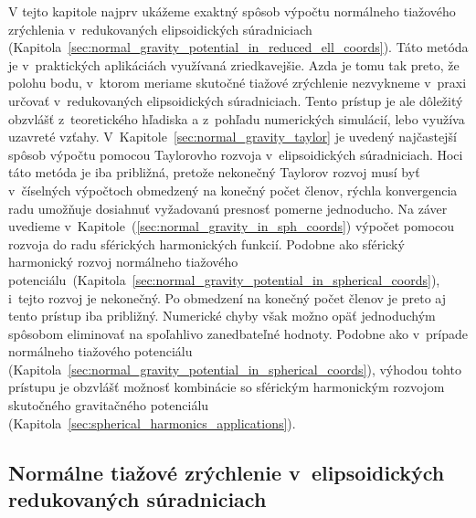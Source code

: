 \documentclass[a4paper,12pt]{book}
\begin{document}
V tejto kapitole najprv ukážeme exaktný spôsob výpočtu normálneho tiažového 
zrýchlenia v~redukovaných elipsoidických súradniciach 
(Kapitola~\ref{sec:normal_gravity_potential_in_reduced_ell_coords}).  Táto 
metóda je v~praktických aplikáciách využívaná zriedkavejšie.  Azda je tomu tak 
preto, že polohu bodu, v~ktorom meriame skutočné tiažové zrýchlenie nezvykneme 
v~praxi určovať v~redukovaných elipsoidických súradniciach.  Tento prístup je 
ale dôležitý obzvlášť z~teoretického hľadiska a z~pohľadu numerických 
simulácií, lebo využíva uzavreté vzťahy.  
V~Kapitole~\ref{sec:normal_gravity_taylor} je uvedený najčastejší spôsob 
výpočtu pomocou Taylorovho rozvoja v~elipsoidických súradniciach.  Hoci táto 
metóda je iba približná, pretože nekonečný Taylorov rozvoj musí byť v~číselných 
výpočtoch obmedzený na konečný počet členov, rýchla konvergencia radu umožňuje 
dosiahnuť vyžadovanú presnosť pomerne jednoducho.  Na záver uvedieme 
v~Kapitole~(\ref{sec:normal_gravity_in_sph_coords}) výpočet pomocou rozvoja do 
radu sférických harmonických funkcií.  Podobne ako sférický harmonický rozvoj 
normálneho tiažového 
potenciálu~(Kapitola~\ref{sec:normal_gravity_potential_in_spherical_coords}), 
i~tejto rozvoj je nekonečný.  Po obmedzení na konečný počet členov je preto aj
tento prístup iba približný.  Numerické chyby však možno opäť jednoduchým 
spôsobom eliminovať na spoľahlivo zanedbateľné hodnoty.  Podobne ako v~prípade 
normálneho tiažového potenciálu 
(Kapitola~\ref{sec:normal_gravity_potential_in_spherical_coords}), výhodou 
tohto prístupu je obzvlášť možnosť kombinácie so sférickým harmonickým rozvojom 
skutočného gravitačného potenciálu 
(Kapitola~\ref{sec:spherical_harmonics_applications}).



\subsection{Normálne tiažové zrýchlenie v~elipsoidických redukovaných 
súradniciach}
\label{sec:normal_gravity_in_reduced_ell_coords}
\end{document}
